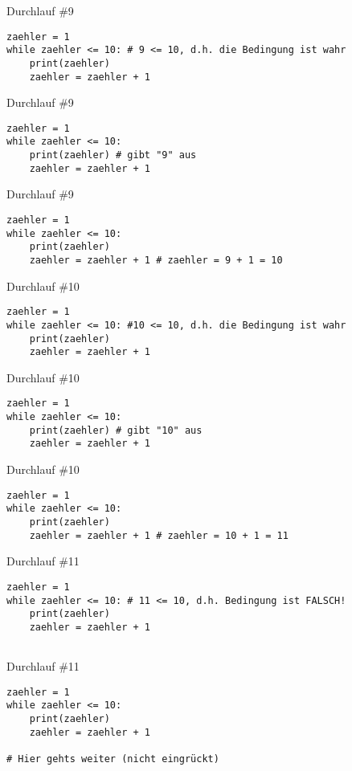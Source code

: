 \documentclass{\VorlagenPfad/coderdojokabeamer}
\begin{document}
\begin{frame}[fragile]{Durchlauf \#9}
	\begin{verbatim}
zaehler = 1
while zaehler <= 10: # 9 <= 10, d.h. die Bedingung ist wahr
	print(zaehler)
	zaehler = zaehler + 1
	\end{verbatim}
\end{frame}

\begin{frame}[fragile]{Durchlauf \#9}
	\begin{verbatim}
zaehler = 1
while zaehler <= 10:
	print(zaehler) # gibt "9" aus
	zaehler = zaehler + 1
	\end{verbatim}
\end{frame}

\begin{frame}[fragile]{Durchlauf \#9}
	\begin{verbatim}
zaehler = 1
while zaehler <= 10:
	print(zaehler)
	zaehler = zaehler + 1 # zaehler = 9 + 1 = 10
	\end{verbatim}
\end{frame}



\begin{frame}[fragile]{Durchlauf \#10}
	\begin{verbatim}
zaehler = 1
while zaehler <= 10: #10 <= 10, d.h. die Bedingung ist wahr
	print(zaehler)
	zaehler = zaehler + 1
	\end{verbatim}
\end{frame}

\begin{frame}[fragile]{Durchlauf \#10}
	\begin{verbatim}
zaehler = 1
while zaehler <= 10:
	print(zaehler) # gibt "10" aus
	zaehler = zaehler + 1
	\end{verbatim}
\end{frame}

\begin{frame}[fragile]{Durchlauf \#10}
	\begin{verbatim}
zaehler = 1
while zaehler <= 10:
	print(zaehler)
	zaehler = zaehler + 1 # zaehler = 10 + 1 = 11
	\end{verbatim}
\end{frame}



\begin{frame}[fragile]{Durchlauf \#11}
	\begin{verbatim}
zaehler = 1
while zaehler <= 10: # 11 <= 10, d.h. Bedingung ist FALSCH!
	print(zaehler) 
	zaehler = zaehler + 1 
	
	\end{verbatim}
\end{frame}

\begin{frame}[fragile]{Durchlauf \#11}
	\begin{verbatim}
zaehler = 1
while zaehler <= 10:
	print(zaehler) 
	zaehler = zaehler + 1 
		
# Hier gehts weiter (nicht eingrückt)
	\end{verbatim}
\end{frame}
\end{document}
